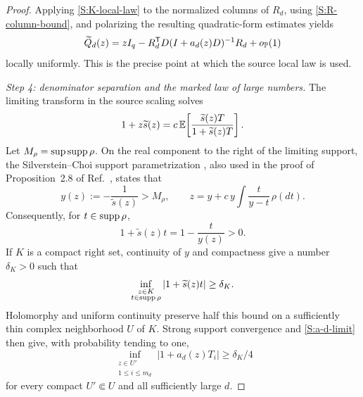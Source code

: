 \begin{proof}
Applying \eqref{S:K-local-law} to the normalized columns of $R_d$, using
\eqref{S:R-column-bound}, and polarizing the resulting quadratic-form
estimates yields
\begin{equation}
\widetilde Q_d(z)
=
zI_q-R_d^{\mathsf T}D(I+a_d(z)D)^{-1}R_d+o_{\mathbb{P}}(1)
\label{S:Q-local-law}
\end{equation}
locally uniformly.  This is the precise point at which the source local law
is used.

\emph{Step 4: denominator separation and the marked law of large numbers.}
The limiting transform in the source scaling solves
\begin{equation}
1+z\widetilde s(z)
=
c\,\mathbb{E}\!\left[
\frac{\widetilde s(z)T}{1+\widetilde s(z)T}
\right].
\label{S:source-fixed}
\end{equation}
Let $M_\rho=\sup\operatorname{supp}\rho$.  On the real component to the right of the
limiting support, the Silverstein--Choi support parametrization
\cite{SilversteinChoi1995}, also used in the proof of Proposition~2.8 of
Ref.~\cite{BenArousEtAl2025}, states that
\begin{equation}
y(z):=-\frac1{\widetilde s(z)}>M_\rho,
\qquad
z=y+c\,y\int\frac{t}{y-t}\,\rho(dt).
\label{S:support-map}
\end{equation}
Consequently, for $t\in\operatorname{supp}\rho$,
\begin{equation}
1+\widetilde s(z)t=1-\frac{t}{y(z)}>0.
\end{equation}
If $K$ is a compact right set, continuity of $y$ and compactness give a
number $\delta_K>0$ such that
\begin{equation}
\inf_{\substack{z\in K\\t\in\operatorname{supp}\rho}}
|1+\widetilde s(z)t|\ge\delta_K.
\label{S:marked-denominator}
\end{equation}
Holomorphy and uniform continuity preserve half this bound on a sufficiently
thin complex neighborhood $U$ of $K$.  Strong support convergence and
\eqref{S:a-d-limit} then give, with probability tending to one,
\begin{equation}
\inf_{\substack{z\in U'\\1\le i\le m_d}}
|1+a_d(z)T_i|\ge\delta_K/4
\label{S:finite-denominator}
\end{equation}
for every compact $U'\Subset U$ and all sufficiently large $d$.


\end{proof}

